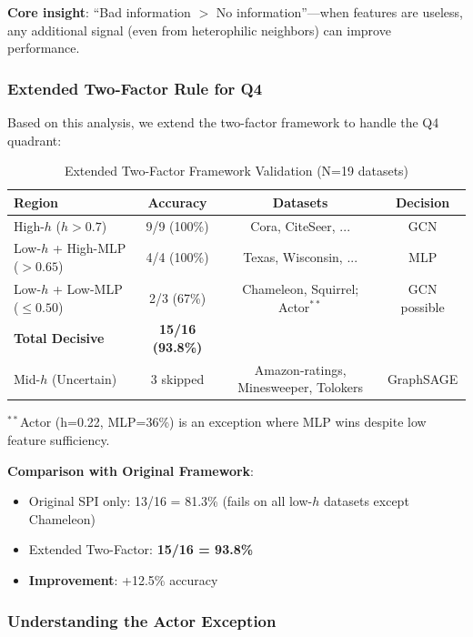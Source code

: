 \textbf{Core insight}: ``Bad information $>$ No information''---when features are useless, any additional signal (even from heterophilic neighbors) can improve performance.

\subsubsection{Extended Two-Factor Rule for Q4}

Based on this analysis, we extend the two-factor framework to handle the Q4 quadrant:

\begin{table}[t]
\centering
\caption{Extended Two-Factor Framework Validation (N=19 datasets)}
\label{tab:extended_two_factor}
\small
\begin{tabular}{@{}lccc@{}}
\toprule
\textbf{Region} & \textbf{Accuracy} & \textbf{Datasets} & \textbf{Decision} \\
\midrule
High-$h$ ($h > 0.7$) & 9/9 (100\%) & Cora, CiteSeer, ... & GCN \\
Low-$h$ + High-MLP ($> 0.65$) & 4/4 (100\%) & Texas, Wisconsin, ... & MLP \\
Low-$h$ + Low-MLP ($\leq 0.50$) & 2/3 (67\%) & Chameleon, Squirrel; Actor$^{**}$ & GCN possible \\
\midrule
\textbf{Total Decisive} & \textbf{15/16 (93.8\%)} & & \\
\midrule
Mid-$h$ (Uncertain) & 3 skipped & Amazon-ratings, Minesweeper, Tolokers & GraphSAGE \\
\bottomrule
\end{tabular}
\vspace{1mm}
\raggedright\small $^{**}$Actor (h=0.22, MLP=36\%) is an exception where MLP wins despite low feature sufficiency.
\end{table}

\textbf{Comparison with Original Framework}:
\begin{itemize}
    \item Original SPI only: 13/16 = 81.3\% (fails on all low-$h$ datasets except Chameleon)
    \item Extended Two-Factor: \textbf{15/16 = 93.8\%}
    \item \textbf{Improvement}: +12.5\% accuracy
\end{itemize}

\subsubsection{Understanding the Actor Exception}

